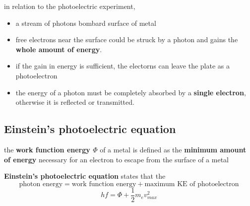 \documentclass[a4paper, 10pt]{article}
\begin{document}
in relation to the photoelectric experiment, 
\begin{itemize}
   \item a stream of photons bombard surface of metal
   \item free electrons near the surface could be struck by a photon and gains the \textbf{whole amount of energy}. 
   \item if the gain in energy is sufficient, the electorns can leave the plate as a photoelectron
   \item the energy of a photon must be completely absorbed by a \textbf{single electron}, otherwise it is reflected or transmitted. 
\end{itemize}	

\subsection{Einstein's photoelectric equation}
\begin{framed}
   the \textbf{work function energy $\Phi$} of a metal is defined as the \textbf{minimum amount of energy} necessary for an electron to escape from the surface of a metal
\end{framed}	

\begin{framed}
   \textbf{Einstein's photoelectric equation} states that the 
   \[
      \text{photon energy} = \text{work function energy} + \text{maximum KE of photoelectron}
   \]
   \[
      hf = \Phi + \frac{1}{2} m_e v_{max}^2
   \]
\end{framed}	
\end{document}
